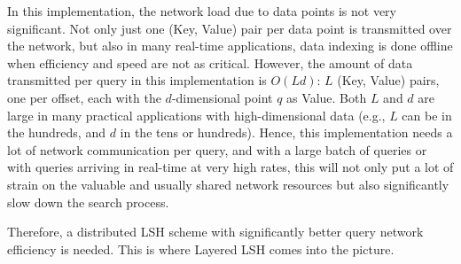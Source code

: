 \documentclass{acm_proc_article-sp}
\numberwithin{equation}{section}
\numberwithin{figure}{section}
\begin{document}
In this implementation, the network load due to data points is not very significant. Not only just one (Key, Value) pair per data point is transmitted over the network, but also in many real-time applications, data indexing is done offline when efficiency and speed are not as critical. However, the amount of data transmitted per query in this implementation is $O(Ld)$: $L$ (Key, Value) pairs, one per offset, each with the $d$-dimensional point $q$ as Value. Both $L$ and $d$ are large in many practical applications with high-dimensional data (e.g., $L$ can be in the hundreds, and $d$ in the tens or hundreds). Hence, this implementation needs a lot of network communication per query, and with a large batch of queries or with queries arriving in real-time at very high rates, this will not only put a lot of strain on the valuable and usually shared network resources but also significantly slow down the search process.

Therefore, a distributed LSH scheme with significantly better query network efficiency is needed. This is where Layered LSH comes into the picture.
\end{document}
